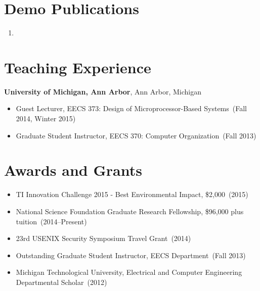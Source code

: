\documentclass{article}
\begin{document}
\section*{Demo Publications}
\begin{enumerate}
  \item {}
\end{enumerate}




\section*{Teaching Experience}
\vspace{-6pt}
{\bf University of Michigan, Ann Arbor}, Ann Arbor, Michigan
\vspace{-6pt}
\begin{itemize}
  \item[] Guest Lecturer, EECS 373: Design of Microprocessor-Based Systems~(Fall 2014, Winter 2015)
  \item[] Graduate Student Instructor, EECS 370: Computer Organization~(Fall 2013)
\end{itemize}

\section*{Awards and Grants}
\vspace{-6pt}
\begin{itemize}
  \item[] TI Innovation Challenge 2015 - Best Environmental Impact, \$2,000~(2015)
  \item[] National Science Foundation Graduate Research Fellowship, \$96,000 plus tuition~(2014--Present)
  \item[] 23rd USENIX Security Symposium Travel Grant~(2014)
  \item[] Outstanding Graduate Student Instructor, EECS Department~(Fall 2013)
  \item[] Michigan Technological University, Electrical and Computer Engineering Departmental Scholar~(2012)
\end{itemize}
\end{document}
